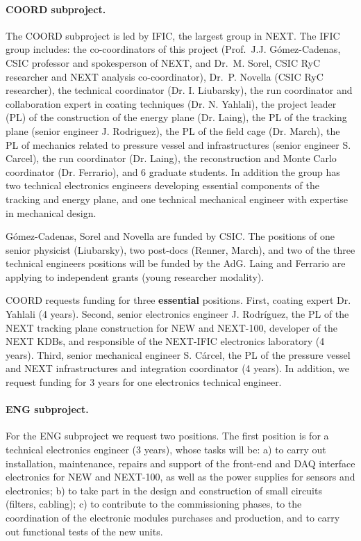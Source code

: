 \paragraph{COORD subproject.}

The COORD subproject is led by IFIC, the largest group in NEXT. The IFIC group includes: the co-coordinators of this project (Prof.~J.J. G\'omez-Cadenas, CSIC professor and spokesperson of NEXT, and Dr.~M. Sorel, CSIC RyC researcher and NEXT analysis co-coordinator), Dr.~P. Novella (CSIC RyC researcher), the technical coordinator (Dr. I. Liubarsky), the run coordinator and collaboration expert in coating techniques (Dr. N. Yahlali), the project leader (PL) of the construction of the energy plane (Dr. Laing), the PL of the tracking plane (senior engineer J. Rodriguez), the PL of the field cage (Dr. March), the PL of mechanics related to pressure vessel and infrastructures (senior engineer S. Carcel), the run coordinator (Dr. Laing), the reconstruction and Monte Carlo coordinator (Dr. Ferrario), and 6 graduate students. In addition the group has two technical electronics engineers developing essential components of the tracking and energy plane, and one technical mechanical engineer with expertise in mechanical design. 

G\'omez-Cadenas, Sorel and Novella are funded by CSIC. The positions of one senior physicist (Liubarsky), two post-docs (Renner, March), and two of the three technical engineers positions will be funded by the AdG. Laing and Ferrario are applying to independent grants (young researcher modality). 

COORD requests funding for three {\bf essential} positions. First, coating expert Dr. Yahlali (4 years). Second, senior electronics engineer J. Rodríguez, the PL of the NEXT tracking plane construction for NEW and NEXT-100, developer of the NEXT KDBs, and responsible of the NEXT-IFIC electronics laboratory (4 years). Third, senior mechanical engineer S. Cárcel, the PL of the pressure vessel and NEXT infrastructures and integration coordinator (4 years). In addition, we request funding for 3 years for one electronics technical engineer.  

\paragraph{ENG subproject.}

For the ENG subproject we request two positions. The first position is for a technical electronics engineer (3 years), whose tasks will be: a) to carry out installation, maintenance, repairs and support of the front-end and DAQ interface electronics for NEW and NEXT-100, as well as the power supplies for sensors and electronics; b) to take part in the design and construction of small circuits (filters, cabling); c) to contribute to the commissioning phases, to the coordination of the electronic modules purchases and production, and to carry out functional tests of the new units. 

